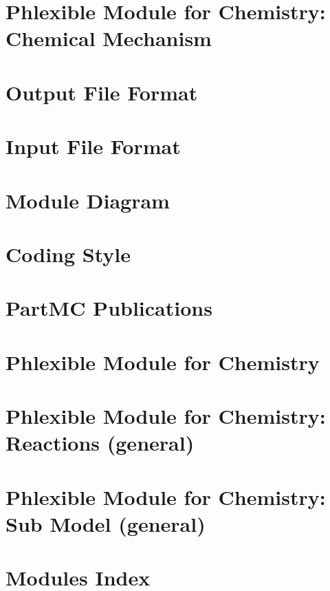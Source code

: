 \documentclass[twoside]{book}
\newcommand{\+}{\discretionary{\mbox{\scriptsize$\hookleftarrow$}}{}{}}
\begin{document}
\chapter{Phlexible Module for Chemistry\+: Chemical Mechanism}
\label{phlex_mechanism}

\chapter{Output File Format}
\label{output_format}

\chapter{Input File Format}
\label{input_format}

\chapter{Module Diagram}
\label{module_diagram}

\chapter{Coding Style}
\label{coding_style}

\chapter{Part\+MC Publications}
\label{publications}

\chapter{Phlexible Module for Chemistry}
\label{phlex_chem}

\chapter{Phlexible Module for Chemistry\+: Reactions (general)}
\label{phlex_rxn}

\chapter{Phlexible Module for Chemistry\+: Sub Model (general)}
\label{phlex_sub_model}

\chapter{Modules Index}

\end{document}
